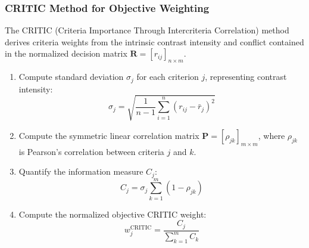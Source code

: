 \documentclass[twocolumn,10pt]{article}
\begin{document}
\subsubsection{CRITIC Method for Objective Weighting}
The CRITIC (Criteria Importance Through Intercriteria Correlation) method derives criteria weights from the intrinsic contrast intensity and conflict contained in the normalized decision matrix $\mathbf{R} = [r_{ij}]_{n \times m}$.
\begin{enumerate}
    \item Compute standard deviation $\sigma_j$ for each criterion $j$, representing contrast intensity:
    \begin{equation}
        \sigma_j = \sqrt{\frac{1}{n-1} \sum_{i=1}^n (r_{ij} - \bar{r}_j)^2}
        \label{eq:critic_std}
    \end{equation}
    \item Compute the symmetric linear correlation matrix $\mathbf{P} = [\rho_{jk}]_{m \times m}$, where $\rho_{jk}$ is Pearson's correlation between criteria $j$ and $k$.
    \item Quantify the information measure $C_j$:
    \begin{equation}
        C_j = \sigma_j \sum_{k=1}^m (1 - \rho_{jk})
        \label{eq:critic_c}
    \end{equation}
    \item Compute the normalized objective CRITIC weight:
    \begin{equation}
        w_j^{\text{CRITIC}} = \frac{C_j}{\sum_{k=1}^m C_k}
        \label{eq:critic_w}
    \end{equation}
\end{enumerate}
\end{document}

